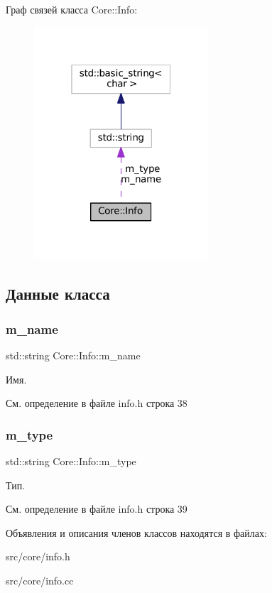 Граф связей класса Core\+:\+:Info\+:\nopagebreak
\begin{figure}[H]
\begin{center}
\leavevmode
\includegraphics[width=184pt]{class_core_1_1_info__coll__graph}
\end{center}
\end{figure}


\subsection{Данные класса}
\hypertarget{class_core_1_1_info_a027464b5db2e89c6c2f48faf99d25b22}{}\label{class_core_1_1_info_a027464b5db2e89c6c2f48faf99d25b22} 
\subsubsection{\texorpdfstring{m\+\_\+name}{m\_name}}
{\footnotesize\ttfamily std\+::string Core\+::\+Info\+::m\+\_\+name\hspace{0.3cm}{\ttfamily [private]}}

Имя. 

См. определение в файле info.\+h строка 38

\hypertarget{class_core_1_1_info_aa5d089f59122826625d6dd68af47775e}{}\label{class_core_1_1_info_aa5d089f59122826625d6dd68af47775e} 
\subsubsection{\texorpdfstring{m\+\_\+type}{m\_type}}
{\footnotesize\ttfamily std\+::string Core\+::\+Info\+::m\+\_\+type\hspace{0.3cm}{\ttfamily [private]}}

Тип. 

См. определение в файле info.\+h строка 39



Объявления и описания членов классов находятся в файлах\+:\begin{DoxyCompactItemize}
\item 
src/core/info.\+h\item 
src/core/info.\+cc\end{DoxyCompactItemize}
